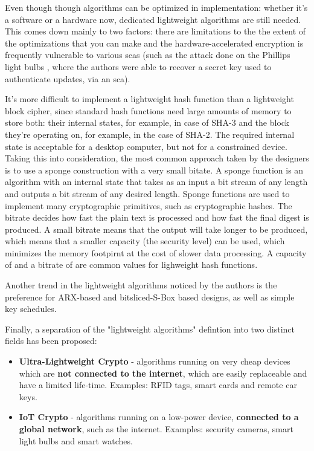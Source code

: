 \documentclass{llncs}
\begin{document}
Even though though algorithms can be optimized in implementation: whether it's
a software or a hardware now, dedicated lightweight algorithms are still needed.
This comes down mainly to two factors: there are limitations to the the extent of
the optimizations that you can make and the hardware-accelerated encryption is
frequently vulnerable to various \gls{sca}s (such as the attack done on the
Phillips light bulbs \cite{cryptoeprint:2016:1047}, where the authors were able to
recover a secret key used to authenticate updates, via an \gls{sca}).

It's more difficult to implement a lightweight hash function than a lightweight
block cipher, since standard hash functions need large amounts
of memory to store both: their internal states, for example,  in case of SHA-3
and the block they're operating on, for example,  in the case of SHA-2.
The required internal state is acceptable for a desktop computer, but not for a
constrained device. Taking this into consideration, the most common approach
taken by the designers is to use a sponge construction with a very small bitate.
A sponge function is an algorithm with an internal state that takes as an input
a bit stream of any length and outputs a bit stream of any desired length. Sponge
functions are used to implement many cryptographic primitives, such as cryptographic
hashes. The bitrate decides how fast the plain text is processed and how fast the
final digest is produced. A small bitrate means that the output will take longer
to be produced, which means that a smaller capacity (the security level)
can be used, which minimizes the memory footpirnt at the cost of slower data
processing. A capacity of  and a bitrate of 
are common values for lighweight hash functions.

Another trend in the lightweight algorithms noticed by the authors is the
preference for ARX-based and bitsliced-S-Box based designs, as well as simple
key schedules.

Finally, a separation of the "lightweight algorithms" defintion into two
distinct fields has been proposed:

\begin{itemize}
  \item \textbf{Ultra-Lightweight Crypto} - algorithms running on very cheap
  devices which are \textbf{not connected to the internet}, which are easily replaceable
  and have a limited life-time. Examples: RFID tags, smart cards and remote car keys.
  \item \textbf{IoT Crypto} - algorithms running on a low-power device,
  \textbf{connected to a global network}, such as the internet. Examples: security cameras,
  smart light bulbs and smart watches.
\end{itemize}
\end{document}
